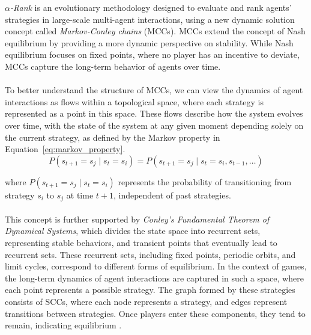 \begin{flushleft}
    \begin{flushleft}

        \emph{$\alpha$-Rank} is an evolutionary methodology designed to evaluate and rank agents' strategies in large-scale multi-agent interactions, using a new dynamic solution concept called \emph{Markov-Conley chains} (MCCs). MCCs extend the concept of Nash equilibrium by providing a more dynamic perspective on stability. While Nash equilibrium focuses on fixed points, where no player has an incentive to deviate, MCCs capture the long-term behavior of agents over time.\\~\\
        
        To better understand the structure of MCCs, we can view the dynamics of agent interactions as flows within a topological space, where each strategy is represented as a point in this space. These flows describe how the system evolves over time, with the state of the system at any given moment depending solely on the current strategy, as defined by the Markov property in Equation~\ref{eq:markov_property}.
        \begin{equation}
            P(s_{t+1} = s_j \mid s_t = s_i) = P(s_{t+1} = s_j \mid s_t = s_i, s_{t-1}, \dots)
            \label{eq:markov_property}
        \end{equation}
        
        where $P(s_{t+1} = s_j \mid s_t = s_i)$ represents the probability of transitioning from strategy $s_i$ to $s_j$ at time $t+1$, independent of past strategies.\\~\\
        
        This concept is further supported by \emph{Conley's Fundamental Theorem of Dynamical Systems}, which divides the state space into recurrent sets, representing stable behaviors, and transient points that eventually lead to recurrent sets. These recurrent sets, including fixed points, periodic orbits, and limit cycles, correspond to different forms of equilibrium. In the context of games, the long-term dynamics of agent interactions are captured in such a space, where each point represents a possible strategy. The graph formed by these strategies consists of SCCs, where each node represents a strategy, and edges represent transitions between strategies. Once players enter these components, they tend to remain, indicating equilibrium \cite{omidshafiei2019alpharank}.\\~\\


\end{flushleft}
\end{flushleft}

